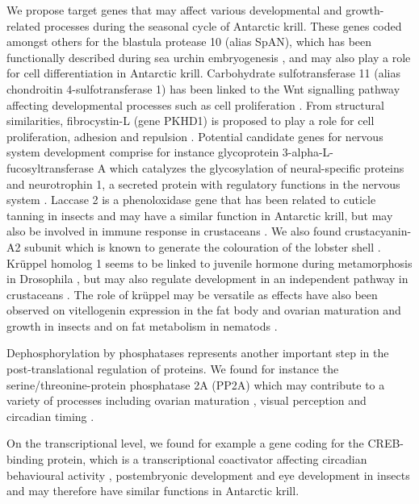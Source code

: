 We propose target genes that may affect various developmental and
growth-related processes during the seasonal cycle of Antarctic krill. These
genes coded amongst others for the blastula protease 10 (alias SpAN), which has
been functionally described during sea urchin embryogenesis
\citep{lepage_spatial_1992}, and may also play a role for cell differentiation
in Antarctic krill.  Carbohydrate sulfotransferase 11 (alias chondroitin
4-sulfotransferase 1) has been linked to the Wnt signalling pathway affecting
developmental processes such as cell proliferation
\citep{nadanaka_chondroitin_2008}. From structural similarities, fibrocystin-L
(gene PKHD1) is proposed to play a role for cell proliferation, adhesion and
repulsion \citep{onuchic_pkhd1_2002}. Potential candidate genes  for nervous
system development comprise for instance glycoprotein
3-alpha-L-fucosyltransferase A which catalyzes the glycosylation of
neural-specific proteins \citep{yamamoto-hino_identification_2010} and
neurotrophin 1, a secreted protein with regulatory functions in the nervous
system \citep{zhu_cryptochromes_2008}. Laccase 2 is a phenoloxidase gene that
has been related to cuticle tanning in insects \citep{arakane_laccase_2005} and
may have a similar function in Antarctic krill, but may also be involved in
immune response in crustaceans \citep{clark_next-generation_2016}. We also
found crustacyanin-A2 subunit which is known to generate the colouration of the
lobster shell \citep{cianci_molecular_2002}.  Krüppel homolog 1 seems to be
linked to juvenile hormone during metamorphosis in Drosophila
\citep{minakuchi_kruppel_2008}, but may also regulate development in an
independent pathway in crustaceans \citep{miyakawa_juvenile_2018}. The role of
krüppel may be versatile as effects have also been observed on vitellogenin
expression in the fat body and ovarian maturation and growth in insects
\citep{song_kruppel-homolog_2014} and on fat metabolism in nematods
\citep{zhang_mutation_2009}.

Dephosphorylation by phosphatases represents another important step in the
post-translational regulation of proteins. We found for instance the
serine/threonine-protein phosphatase 2A (PP2A) which may contribute to a
variety of processes including ovarian maturation \citep{zhao_molecular_2017},
visual perception \citep{wang_role_2008} and circadian timing
\citep{pegoraro_animal_2011}.

On the transcriptional level, we found for example a gene coding for the
CREB-binding protein, which is a transcriptional coactivator affecting
circadian behavioural activity \citep{maurer_creb-binding_2016}, postembryonic
development \citep{roy_multiple_2017} and eye development
\citep{kumar_creb_2004} in insects and may therefore have similar functions in
Antarctic krill.

